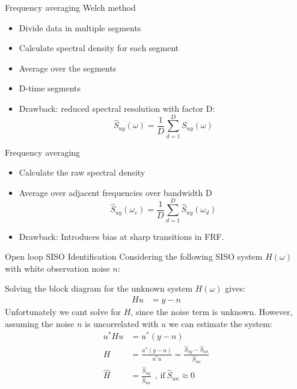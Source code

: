 \documentclass{beamer}
\begin{document}
\begin{frame}{Frequency averaging}
Welch method
\begin{itemize}
		\item Divide data in multiple segments
		\item Calculate spectral density for each segment
		\item Average over the segments
		\item D-time segments
		\item Drawback: reduced spectral resolution with factor D:
		\begin{equation} \hat{S}_{uy}(\omega) = \frac{1}{D}\sum^D_{d=1}S_{uy}(\omega) \end{equation}
\end{itemize}
Frequency averaging
\begin{itemize}
\item Calculate the raw spectral density
\item Average over adjacent frequencies over bandwidth D
\begin{equation} \hat{S}_{uy}(\omega_c) = \frac{1}{D}\sum^D_{d=1}\hat{S}_{uy}(\omega_d)\end{equation}
\item Drawback: Introduces bias at sharp transitions in FRF.
\end{itemize}
\end{frame}

\begin{frame}{Open loop SISO Identification}
		Considering the following SISO system $H(\omega)$ with white observation noise $n$:
		
		Solving the block diagram for the unknown system $H(\omega)$ gives:
		\begin{align}
		Hu & = y-n 
		\end{align}
		Unfortunately we cant solve for $H$, since the noise term is unknown. However, assuming the noise $n$ is uncorrelated with $u$ we can estimate the system:
				\begin{align}
						u^\ast Hu & = u^\ast (y-n) \nonumber \\
						H 					& = \frac{u^\ast (y-n)}{u^\ast u} =  \frac{\hat{S}_{uy} - \hat{S}_{un}}{\hat{S}_{uu}}  \nonumber \\
						\hat{H}	& = \frac{\hat{S}_{uy}}{\hat{S}_{uu}} \ \ \textrm{, if} \ \hat{S}_{un} \approx 0
				\end{align}
\end{frame}
\end{document}
